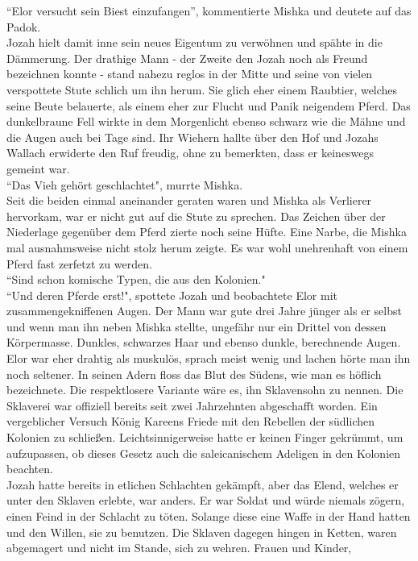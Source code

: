 ``Elor versucht sein Biest einzufangen'', kommentierte Mishka und deutete auf das Padok.\\
Jozah hielt damit inne sein neues Eigentum zu verwöhnen und spähte in die Dämmerung. Der drathige 
Mann - der Zweite den Jozah noch als Freund bezeichnen konnte - stand nahezu reglos in der Mitte 
und seine von vielen verspottete Stute schlich um ihn herum. Sie glich eher einem Raubtier, welches 
seine Beute belauerte, als einem eher zur Flucht und Panik neigendem Pferd. Das dunkelbraune Fell 
wirkte in dem Morgenlicht ebenso schwarz wie die Mähne und die Augen auch bei Tage sind. Ihr 
Wiehern hallte über den Hof und Jozahs Wallach erwiderte den Ruf freudig, ohne zu bemerkten, dass 
er keineswegs gemeint war. \\
``Das Vieh gehört geschlachtet", murrte Mishka.\\
Seit die beiden einmal aneinander geraten waren und Mishka als Verlierer hervorkam, war er nicht 
gut auf die Stute zu sprechen. Das Zeichen über der Niederlage gegenüber dem Pferd zierte noch 
seine Hüfte. Eine Narbe, die Mishka mal ausnahmsweise nicht stolz herum zeigte. Es war wohl 
unehrenhaft von einem Pferd fast zerfetzt zu werden. \\
``Sind schon komische Typen, die aus den Kolonien."\\ 
``Und deren Pferde erst!", spottete Jozah und beobachtete Elor mit zusammengekniffenen Augen. 
Der Mann war gute drei Jahre jünger als er selbst und wenn man ihn neben Mishka stellte, ungefähr 
nur ein Drittel von dessen Körpermasse. Dunkles, schwarzes Haar und ebenso dunkle, berechnende 
Augen. Elor war eher drahtig als muskulös, sprach meist wenig und lachen hörte man ihn noch 
seltener. In seinen Adern floss das Blut des Südens, wie man es höflich bezeichnete. Die 
respektlosere Variante wäre es, ihn Sklavensohn zu nennen. Die Sklaverei war offiziell bereits seit 
zwei Jahrzehnten abgeschafft worden. Ein vergeblicher Versuch König Kareens Friede mit den Rebellen 
der südlichen Kolonien zu schließen. Leichtsinnigerweise hatte er keinen Finger gekrümmt, um 
aufzupassen, ob dieses Gesetz auch die saleicanischem Adeligen in den Kolonien beachten.\\
Jozah hatte bereits in etlichen Schlachten gekämpft, aber das Elend, welches er unter den Sklaven 
erlebte, war anders. Er war Soldat und würde niemals zögern, einen Feind in der Schlacht zu töten. 
Solange diese eine Waffe in der Hand hatten und den Willen, sie zu benutzen. Die Sklaven dagegen 
hingen in Ketten, waren abgemagert und nicht im Stande, sich zu wehren. Frauen und Kinder, 
